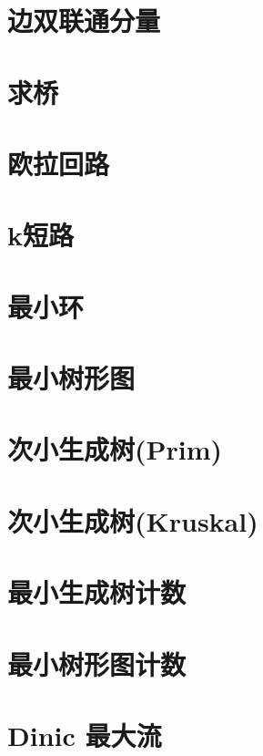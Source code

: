 \section{边双联通分量}
\raggedbottom
\hrulefill
\section{求桥}
\raggedbottom
\hrulefill
\section{欧拉回路}
\raggedbottom
\hrulefill
\section{k短路}
\raggedbottom
\hrulefill
\section{最小环}
\raggedbottom
\hrulefill
\section{最小树形图}
\raggedbottom
\hrulefill
\section{次小生成树(Prim)}
\raggedbottom
\hrulefill
\section{次小生成树(Kruskal)}
\raggedbottom
\hrulefill
\section{最小生成树计数}
\raggedbottom
\hrulefill
\section{最小树形图计数}
\raggedbottom
\hrulefill
\section{Dinic 最大流}
\raggedbottom
\hrulefill
